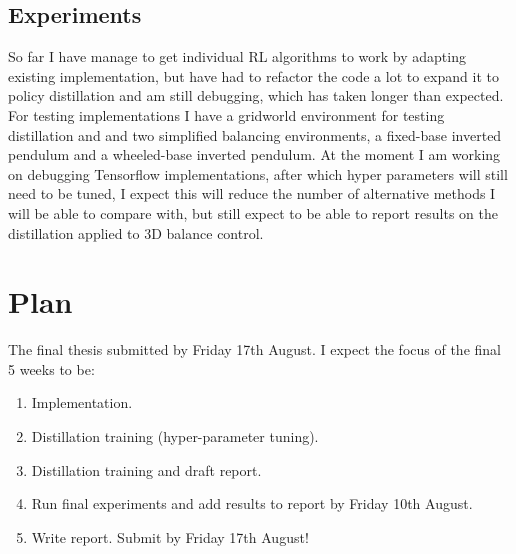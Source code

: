 \documentclass[a4paper]{article}
\begin{document}
\subsection{Experiments}

So far I have manage to get individual RL algorithms to work by adapting existing implementation, but have had to refactor the code a lot to expand it to policy distillation and am still debugging, which has taken longer than expected. For testing implementations I have a gridworld environment for testing distillation and and two simplified balancing environments, a fixed-base inverted pendulum and a wheeled-base inverted pendulum. At the moment I am working on debugging Tensorflow implementations, after which hyper parameters will still need to be tuned, I expect this will reduce the number of alternative methods I will be able to compare with, but still expect to be able to report results on the distillation applied to 3D balance control.

\section{Plan}
The final thesis submitted by Friday 17th August. I expect the focus of the final 5 weeks to be:
\begin{enumerate}
\item Implementation.
\item Distillation training (hyper-parameter tuning).
\item Distillation training and draft report.
\item Run final experiments and add results to report by Friday 10th August.
\item Write report. Submit by Friday 17th August!
\end{enumerate}



\end{document}
